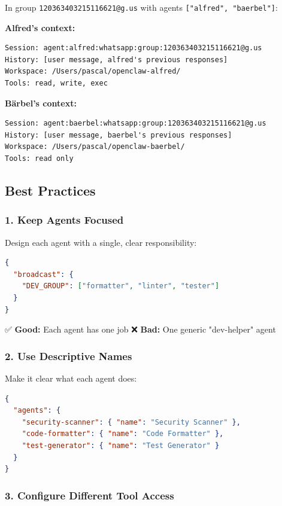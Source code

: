 In group \texttt{120363403215116621@g.us} with agents \texttt{["alfred", "baerbel"]}:

\textbf{Alfred's context:}

\begin{lstlisting}
Session: agent:alfred:whatsapp:group:120363403215116621@g.us
History: [user message, alfred's previous responses]
Workspace: /Users/pascal/openclaw-alfred/
Tools: read, write, exec
\end{lstlisting}


\textbf{Bärbel's context:}

\begin{lstlisting}
Session: agent:baerbel:whatsapp:group:120363403215116621@g.us
History: [user message, baerbel's previous responses]
Workspace: /Users/pascal/openclaw-baerbel/
Tools: read only
\end{lstlisting}


\subsection{Best Practices}


\subsubsection{1. Keep Agents Focused}


Design each agent with a single, clear responsibility:

\begin{lstlisting}[language=json]
{
  "broadcast": {
    "DEV_GROUP": ["formatter", "linter", "tester"]
  }
}
\end{lstlisting}


✅ \textbf{Good:} Each agent has one job
❌ \textbf{Bad:} One generic "dev-helper" agent

\subsubsection{2. Use Descriptive Names}


Make it clear what each agent does:

\begin{lstlisting}[language=json]
{
  "agents": {
    "security-scanner": { "name": "Security Scanner" },
    "code-formatter": { "name": "Code Formatter" },
    "test-generator": { "name": "Test Generator" }
  }
}
\end{lstlisting}


\subsubsection{3. Configure Different Tool Access}


